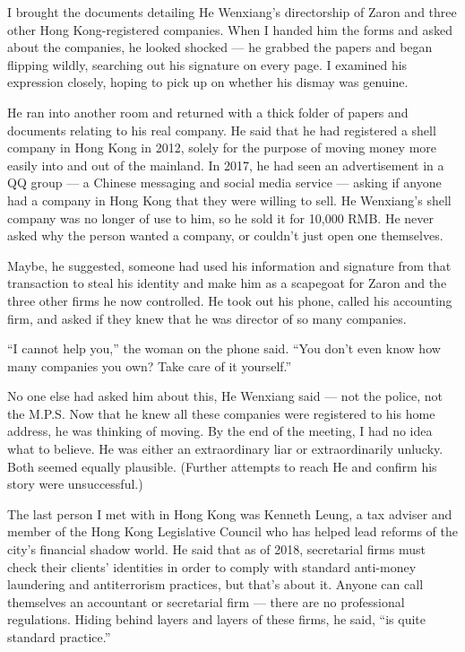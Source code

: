 I brought the documents detailing He Wenxiang's directorship of Zaron
and three other Hong Kong-registered companies. When I handed him the
forms and asked about the companies, he looked shocked --- he grabbed
the papers and began flipping wildly, searching out his signature on
every page. I examined his expression closely, hoping to pick up on
whether his dismay was genuine.

He ran into another room and returned with a thick folder of papers and
documents relating to his real company. He said that he had registered a
shell company in Hong Kong in 2012, solely for the purpose of moving
money more easily into and out of the mainland. In 2017, he had seen an
advertisement in a QQ group --- a Chinese messaging and social media
service --- asking if anyone had a company in Hong Kong that they were
willing to sell. He Wenxiang's shell company was no longer of use to
him, so he sold it for 10,000 RMB. He never asked why the person wanted
a company, or couldn't just open one themselves.

Maybe, he suggested, someone had used his information and signature from
that transaction to steal his identity and make him as a scapegoat for
Zaron and the three other firms he now controlled. He took out his
phone, called his accounting firm, and asked if they knew that he was
director of so many companies.

``I cannot help you,'' the woman on the phone said. ``You don't even
know how many companies you own? Take care of it yourself.''

No one else had asked him about this, He Wenxiang said --- not the
police, not the M.P.S. Now that he knew all these companies were
registered to his home address, he was thinking of moving. By the end of
the meeting, I had no idea what to believe. He was either an
extraordinary liar or extraordinarily unlucky. Both seemed equally
plausible. (Further attempts to reach He and confirm his story were
unsuccessful.)

The last person I met with in Hong Kong was Kenneth Leung, a tax adviser
and member of the Hong Kong Legislative Council who has helped lead
reforms of the city's financial shadow world. He said that as of 2018,
secretarial firms must check their clients' identities in order to
comply with standard anti-money laundering and antiterrorism practices,
but that's about it. Anyone can call themselves an accountant or
secretarial firm --- there are no professional regulations. Hiding
behind layers and layers of these firms, he said, ``is quite standard
practice.''

